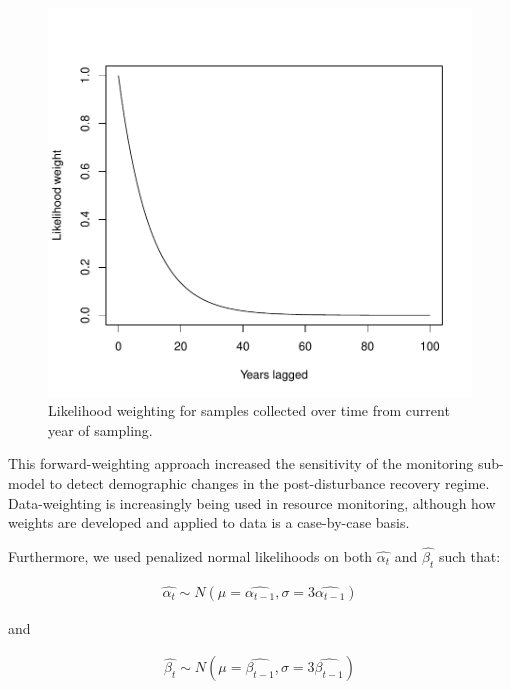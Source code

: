 \documentclass[
]{article}
\begin{document}
\begin{figure}[H]

{\centering \includegraphics{Managing_for_ecological_surprises_in_metapopulations_files/figure-latex/unnamed-chunk-1-1} 

}

\caption{Likelihood weighting for samples collected over time from current year of sampling.}\label{fig:unnamed-chunk-1}
\end{figure}

This forward-weighting approach increased the sensitivity of the
monitoring sub-model to detect demographic changes in the
post-disturbance recovery regime. Data-weighting is increasingly being
used in resource monitoring, although how weights are developed and
applied to data is a case-by-case basis.

Furthermore, we used penalized normal likelihoods on both
\(\hat{\alpha_t}\) and \(\hat{\beta_t}\) such that:

\begin{align}
\hat{\alpha_t} \sim N(\mu=\hat{\alpha_{t-1}},\sigma=3\hat{\alpha_{t-1}})
\end{align}

and

\begin{align}
\hat{\beta_t} \sim N(\mu=\hat{\beta_{t-1}},\sigma=3\hat{\beta_{t-1}})
\end{align}
\end{document}
